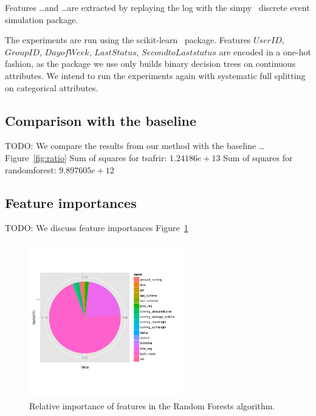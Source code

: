 \documentclass{article}
\begin{document}
Features \ldots and \ldots are extracted by replaying the log with the simpy~\cite{simpy} discrete event simulation package.

The experiments are run using the scikit-learn~\cite{scikit-learn} package. Features $User ID$, $ Group ID$, $ Day of Week$, $ Last Status$, $ Second to Last status$ are encoded in a one-hot fashion, as the package we use only builds binary decision trees on continuous attributes.
We intend to run the experiments again with systematic full splitting on categorical attributes.


\subsection{Comparison with the baseline}
\label{sub:comparison_with_average_baseline}
TODO:
We compare the results from our method with the baseline \ldots Figure~\ref{fig:ratio}
Sum of squares for tsafrir: $1.24186e+13$
Sum of squares for randomforest: $9.897605e+12$



\subsection{Feature importances}
\label{sub:feature_importances}
TODO:
We discuss feature importances \lots Figure~\ref{fig:importances}
\begin{figure}[ht]
        \includegraphics[width=0.6\textwidth]{../../pie.png}
        \caption{Relative importance of features in the Random Forests algorithm.}
        \label{fig:importances}
\end{figure}
\end{document}
